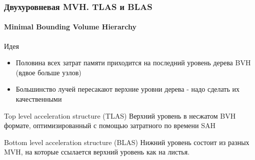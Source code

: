 \begin{frame}[t]
    \frametitle{Двухуровневая MVH. TLAS и BLAS}
    \framesubtitle{Minimal Bounding Volume Hierarchy}
    \begin{block}{Идея}
        \begin{itemize}
            \item
                Половина всех затрат памяти приходится на последний уровень дерева BVH (вдвое больше узлов)
            \item
                Большинство лучей пересакают верхние уровни дерева - надо сделать их качественными
        \end{itemize}
    \end{block}
    \begin{block}{Top level acceleration structure (TLAS)}
        Верхний уровень в несжатом BVH формате, оптимизированный с помощью затратного по времени SAH
    \end{block}
    \begin{block}{Bottom level acceleration structure (BLAS)}
        Нижний уровень состоит из разных MVH, на которые ссылается верхний уровень как на листья.
    \end{block}
\end{frame}

